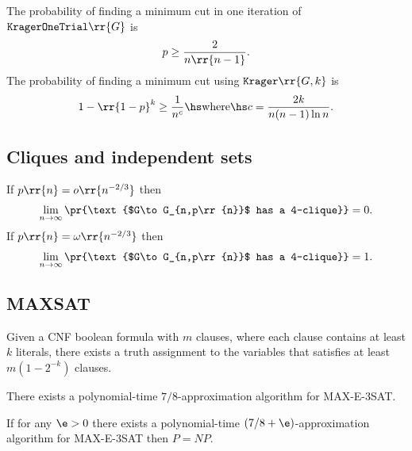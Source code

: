 \documentclass{article}
\begin{document}
\begin{theorem}
  \label{thm:krager-probabilities}
  The probability of finding a minimum cut in one iteration of $ \texttt{KragerOneTrial} \rr{ G }$
  is
  \begin{align*}
    p \geq \frac{2}{n \rr{ n-1 }}.
  \end{align*}
  The probability of finding a minimum cut using $ \texttt{Krager} \rr{ G,k }$ is
  \begin{align*}
    1-\rr{ 1-p }^k \geq \frac{1}{n^c} \hs \text{where} \hs c = \frac{2k}{n(n-1)\ln n}.
  \end{align*}
\end{theorem}

\subsection{Cliques and independent sets}

\begin{theorem}
  If $p\rr{n}=o\rr{n^{-2/3}}$ then
  \begin{align*}
    \lim_{n\to\infty} \pr{\text{$G\to G_{n,p\rr{n}}$ has a 4-clique}}=0.
  \end{align*}
  If $p\rr{n}=\omega\rr{n^{-2/3}}$ then
  \begin{align*}
    \lim_{n\to\infty} \pr{\text{$G\to G_{n,p\rr{n}}$ has a 4-clique}}=1.
  \end{align*}
\end{theorem}

\subsection{MAXSAT}\label{sec:maxsat}

\begin{theorem}
  Given a CNF boolean formula with $m$ clauses, where each clause contains at least $k$ literals,
  there exists a truth assignment to the variables that satisfies at least $m(1-2^{-k})$ clauses.
\end{theorem}

\begin{lemma}
  There exists a polynomial-time $7/8$-approximation algorithm for MAX-E-3SAT.
\end{lemma}

\begin{theorem}[Hastad]
  If for any $\e>0$ there exists a polynomial-time $(7/8+\e)$-approximation algorithm for
  MAX-E-3SAT then $P=NP$.
\end{theorem}
\end{document}
